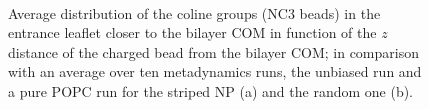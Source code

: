 \begin{figure}[p]
	\center
	\\%
	\caption{Average distribution of the coline groups (NC3 beads) in the entrance leaflet closer to the bilayer \acs{COM} in function of the $z$ distance of the charged bead from the bilayer \acs{COM}; in comparison with an average over ten metadynamics runs, the unbiased run and a pure \acs{POPC} run for the striped \acs{NP} (a) and the random one (b).}
\end{figure}

